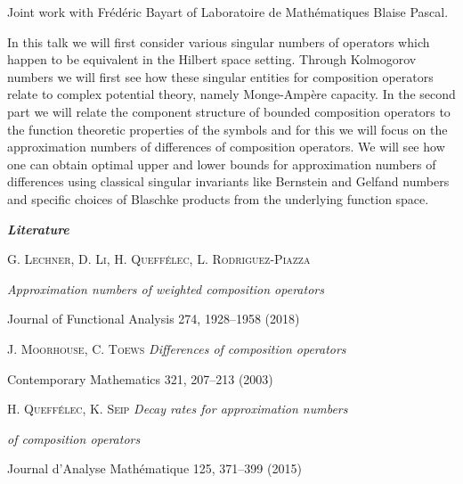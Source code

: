 {
    Joint work with Frédéric Bayart of Laboratoire de Mathématiques Blaise Pascal.

    In this talk we will first consider various singular numbers of operators
    which happen to be equivalent in the Hilbert space setting. Through
    Kolmogorov numbers we will first see how these singular entities for
    composition operators relate to complex potential theory, namely
    Monge-Amp\`ere capacity. In the second part we will relate the component
    structure of bounded composition operators to the function theoretic
    properties of the symbols and for this we will focus on the approximation
    numbers of differences of composition operators. We will see how one can
    obtain optimal upper and lower bounds for approximation numbers of
    differences using classical singular invariants like Bernstein and
    Gelfand numbers and specific choices of Blaschke products from the
    underlying function space.

    \bigskip
    \noindent
    \textit{\textbf{\large Literature}}

    \medskip
    \noindent
    \textsc{G. Lechner, D. Li, H. Queffélec, L. Rodriguez-Piazza}
    
    \hfill \textit{Approximation numbers of weighted composition operators}

    \hfill Journal of Functional Analysis 274, 1928–1958 (2018)

    \smallskip
    \noindent
    \textsc{J. Moorhouse, C. Toews}
    \hfill \textit{Differences of composition operators}

    \hfill Contemporary Mathematics 321, 207–213 (2003)

    \smallskip
    \noindent
    \textsc{H. Queffélec, K. Seip}
    \hfill \textit{Decay rates for approximation numbers}

    \hfill \textit{of composition operators}

    \hfill Journal d’Analyse Mathématique 125, 371–399 (2015)%
}
